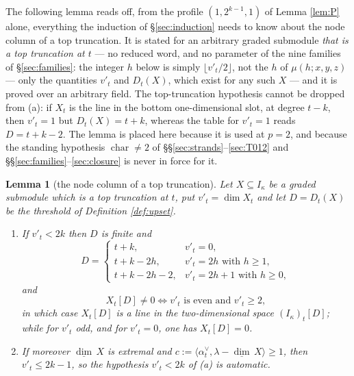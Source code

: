 \documentclass[reqno]{amsart}
\theoremstyle{plain}
\newtheorem{lemma}[theorem]{Lemma}
\theoremstyle{definition}
\newcommand{\dimv}{\underline{\dim}\,}
\newcommand{\la}{\lambda}
\newcommand{\al}{\alpha}
\newcommand{\ka}{\kappa}
\begin{document}
The following lemma reads off, from the profile $(1,2^{k-1},1)$ of Lemma
\ref{lem:P} alone, everything the induction of \S\ref{sec:induction} needs to
know about the node column of a top truncation.  It is stated for an arbitrary
graded submodule \emph{that is a top truncation at $t$} --- no reduced word,
and no parameter of the nine families of \S\ref{sec:families}: the integer $h$
below is simply $\lfloor v'_t/2\rfloor$, not the $h$ of $\mu(h;x,y,z)$ ---
only the quantities $v'_t$ and $D_t(X)$, which exist for any
such $X$ --- and it is proved over an arbitrary field.  The top-truncation
hypothesis cannot be dropped from \textup{(a)}: if $X_t$ is the line in the
bottom one-dimensional slot, at degree $t-k$, then $v'_t=1$ but
$D_t(X)=t+k$, whereas the table for $v'_t=1$ reads $D=t+k-2$.  The lemma is
placed here because it is used at $p=2$, and because the standing hypothesis
$\operatorname{char}\ne2$ of \S\S\ref{sec:strands}--\ref{sec:T012} and
\S\S\ref{sec:families}--\ref{sec:closure} is never in force for it.

\begin{lemma}[the node column of a top truncation]\label{lem:nodefree}
Let $X\subseteq I_\ka$ be a graded submodule which is a top truncation at $t$,
put $v'_t=\dim X_t$ and let $D=D_t(X)$ be the threshold of Definition
\ref{def:upset}.
\begin{enumerate}
\item[\textup{(a)}] If $v'_t<2k$ then $D$ is finite and
\[
   D=\begin{cases}
     t+k, & v'_t=0,\\
     t+k-2h, & v'_t=2h \text{ with } h\ge1,\\
     t+k-2h-2, & v'_t=2h+1 \text{ with } h\ge0,
   \end{cases}
\]
and
\[
   X_t[D]\ne0\iff v'_t \text{ is even and } v'_t\ge2 ,
\]
in which case $X_t[D]$ is a line in the two-dimensional space
$(I_\ka)_t[D]$; while for $v'_t$ odd, and for $v'_t=0$, one has $X_t[D]=0$.
\item[\textup{(b)}] If moreover $\dimv X$ is extremal and
$c:=\langle\al_t^\vee,\la-\dimv X\rangle\ge1$, then $v'_t\le2k-1$, so the
hypothesis $v'_t<2k$ of \textup{(a)} is automatic.
\end{enumerate}
\end{lemma}
\end{document}
